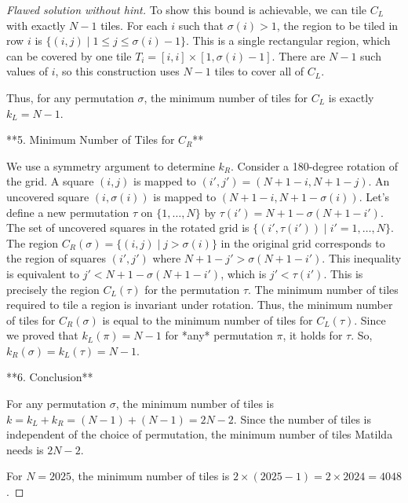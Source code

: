 \begin{proof} [Flawed solution without hint]
To show this bound is achievable, we can tile $C_L$ with exactly $N-1$ tiles. For each $i$ such that $\sigma(i)>1$, the region to be tiled in row $i$ is $\{(i,j) \mid 1 \le j \le \sigma(i)-1\}$. This is a single rectangular region, which can be covered by one tile $T_i = [i,i] \times [1, \sigma(i)-1]$. There are $N-1$ such values of $i$, so this construction uses $N-1$ tiles to cover all of $C_L$.

Thus, for any permutation $\sigma$, the minimum number of tiles for $C_L$ is exactly $k_L = N-1$.

**5. Minimum Number of Tiles for $C_R$**

We use a symmetry argument to determine $k_R$. Consider a 180-degree rotation of the grid. A square $(i,j)$ is mapped to $(i',j') = (N+1-i, N+1-j)$. An uncovered square $(i, \sigma(i))$ is mapped to $(N+1-i, N+1-\sigma(i))$.
Let's define a new permutation $\tau$ on $\{1, \dots, N\}$ by $\tau(i') = N+1-\sigma(N+1-i')$. The set of uncovered squares in the rotated grid is $\{(i', \tau(i')) \mid i'=1, \dots, N\}$.
The region $C_R(\sigma) = \{(i,j) \mid j > \sigma(i)\}$ in the original grid corresponds to the region of squares $(i',j')$ where $N+1-j' > \sigma(N+1-i')$. This inequality is equivalent to $j' < N+1-\sigma(N+1-i')$, which is $j' < \tau(i')$. This is precisely the region $C_L(\tau)$ for the permutation $\tau$.
The minimum number of tiles required to tile a region is invariant under rotation. Thus, the minimum number of tiles for $C_R(\sigma)$ is equal to the minimum number of tiles for $C_L(\tau)$.
Since we proved that $k_L(\pi) = N-1$ for *any* permutation $\pi$, it holds for $\tau$. So, $k_R(\sigma) = k_L(\tau) = N-1$.

**6. Conclusion**

For any permutation $\sigma$, the minimum number of tiles is $k = k_L + k_R = (N-1) + (N-1) = 2N-2$.
Since the number of tiles is independent of the choice of permutation, the minimum number of tiles Matilda needs is $2N-2$.

For $N=2025$, the minimum number of tiles is $2 \times (2025-1) = 2 \times 2024 = 4048$.
\end{proof}



